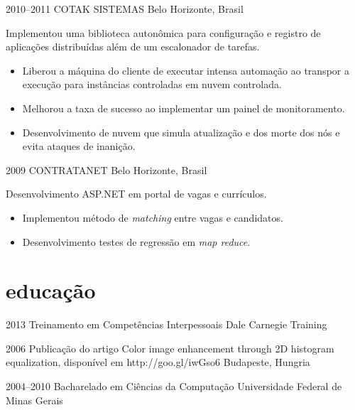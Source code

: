 \documentclass[]{friggeri-cv}
\begin{document}
\begin{entrylist}
\entry
{2010--2011}
{COTAK SISTEMAS}
{Belo Horizonte, Brasil}
{ Implementou uma biblioteca autonômica para configuração e registro de aplicações distribuídas além de um escalonador de tarefas.

  \begin{itemize}
    \item Liberou a máquina do cliente de executar intensa automação ao transpor a execução para instâncias controladas em nuvem controlada.
    \item Melhorou a taxa de sucesso ao implementar um painel de monitoramento.
    \item Desenvolvimento de nuvem que simula atualização e dos morte dos nós e evita ataques de inanição.
  \end{itemize}
}

\entry
{2009}
{CONTRATANET}
{Belo Horizonte, Brasil}
{ Desenvolvimento ASP.NET em portal de vagas e currículos.
\begin{itemize}
  \item Implementou método de \textit{matching} entre vagas e candidatos.
  \item Desenvolvimento testes de regressão em \textit{map reduce}.
  \end{itemize}
}


\end{entrylist}

\section{educação}


\begin{entrylist}

\entry
{2013}
{{\normalfont Treinamento em} Competências Interpessoais}
{Dale Carnegie Training}

\entry
{2006}
{Publicação do artigo {\normalfont Color image enhancement through 2D histogram equalization, disponível em http://goo.gl/iwGso6}}
{Budapeste, Hungria}

\entry
{2004--2010}
{{\normalfont Bacharelado em} Ciências da Computação}
{Universidade Federal de Minas Gerais}

\end{entrylist}
\end{document}
